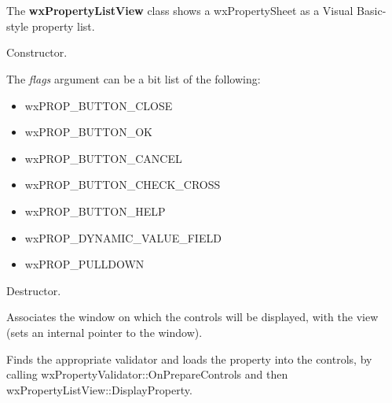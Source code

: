 \section{}\label{wxpropertylistview}

The {\bf wxPropertyListView} class shows a wxPropertySheet as a Visual Basic-style property list.






Constructor.

The {\it flags} argument can be a bit list of the following:

\begin{itemize}\itemsep=0pt
\item wxPROP\_BUTTON\_CLOSE
\item wxPROP\_BUTTON\_OK
\item wxPROP\_BUTTON\_CANCEL
\item wxPROP\_BUTTON\_CHECK\_CROSS
\item wxPROP\_BUTTON\_HELP
\item wxPROP\_DYNAMIC\_VALUE\_FIELD
\item wxPROP\_PULLDOWN
\end{itemize}



Destructor.

\label{wxpropertylistviewassociatepanel}


Associates the window on which the controls will be displayed, with the view (sets an internal pointer to the window).

\label{wxpropertylistviewbeginshowingproperty}


Finds the appropriate validator and loads the property into the controls, by calling
wxPropertyValidator::OnPrepareControls and then wxPropertyListView::DisplayProperty.

